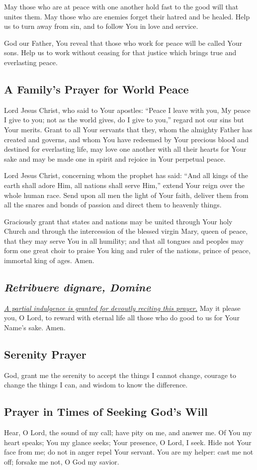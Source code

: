 \documentclass[12pt]{article}
\newcommand{\prayertitle}[1]{\subsection{#1}}
\newcommand{\indulgencedprayertitle}[1]{\prayertitle{#1 \protect\kreuz}}
\newcommand{\foreign}[1]{\textsl{#1}}
\newcommand{\note}[1]{{\small{\textsl{#1}}}\newline}
\newcommand{\linkednote}[2]{\hyperlink{#1}{\note{#2}}}
\begin{document}
May those who are at peace with one another hold fast to the good will that unites them.
May those who are enemies forget their hatred and be healed.
Help us to turn away from sin, and to follow You in love and service.

God our Father, You reveal that those who work for peace will be called Your sons.
Help us to work without ceasing for that justice which brings true and everlasting peace.

\prayertitle{A Family's Prayer for World Peace}
Lord Jesus Christ, who said to Your apostles:
``Peace I leave with you, My peace I give to you;
not as the world gives, do I give to you,''
regard not our sins but Your merits.
Grant to all Your servants that they, whom the almighty Father has created and governs, and whom You have redeemed by Your precious blood and destined for everlasting life, may love one another with all their hearts for Your sake and may be made one in spirit and rejoice in Your perpetual peace.

Lord Jesus Christ, concerning whom the prophet has said:
``And all kings of the earth shall adore Him, all nations shall serve Him,''
extend Your reign over the whole human race.
Send upon all men the light of Your faith, deliver them from all the snares and bonds of passion and direct them to heavenly things.

Graciously grant that states and nations may be united through Your holy Church and through the intercession of the blessed virgin Mary, queen of peace, that they may serve You in all humility;
and that all tongues and peoples may form one great choir to praise You king and ruler of the nations, prince of peace, immortal king of ages.
Amen.

\indulgencedprayertitle{\foreign{Retribuere dignare, Domine}}
\linkednote{grant24}{A partial indulgence is granted for devoutly reciting this prayer.}
May it please you, O Lord, to reward with eternal life all those who do good to us for Your Name's sake. Amen.

\prayertitle{Serenity Prayer}
God, grant me the serenity to accept the things I cannot change,
courage to change the things I can,
and wisdom to know the difference.

\prayertitle{Prayer in Times of Seeking God's Will}
Hear, O Lord, the sound of my call;
have pity on me, and answer me.
Of You my heart speaks;
You my glance seeks;
Your presence, O Lord, I seek.
Hide not Your face from me; 
do not in anger repel Your servant.
You are my helper: cast me not off;
forsake me not, O God my savior.
\end{document}
